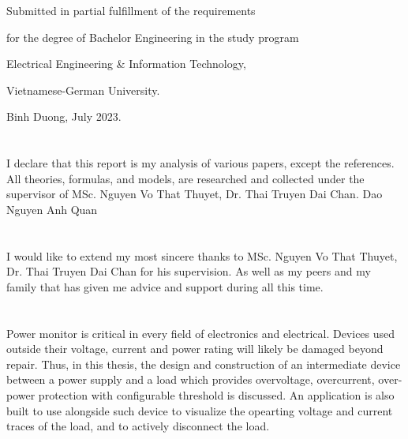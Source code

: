 \documentclass[main.tex]{subfiles}
\begin{document}
    \vspace{2cm}
    \centerline{Submitted in partial fulfillment of the requirements}
    \centerline{for the degree of Bachelor Engineering in the study program}
    \centerline{Electrical Engineering \& Information Technology,}
    \centerline{Vietnamese-German University.}
    \centerline{Binh Duong, July 2023.}

    \pagebreak
    \section*{}
    \justify
    I declare that this report is my analysis of various papers, except the references. All theories, formulas, and models, are researched and collected under the supervisor of MSc. Nguyen Vo That Thuyet, Dr. Thai Truyen Dai Chan.
    \justify
    \hspace{10cm}Dao Nguyen Anh Quan

    \pagebreak
    \section*{}
    \justify
    I would like to extend my most sincere thanks to MSc. Nguyen Vo That Thuyet, Dr. Thai Truyen Dai Chan for his supervision. As well as my peers and my family that has given me advice and support during all this time.

    \pagebreak
    \section*{}
    \justify
    Power monitor is critical in every field of electronics and electrical. Devices used outside their voltage, current and power rating will likely be damaged beyond repair. Thus, in this thesis, the design and construction of an intermediate device between a power supply and a load which provides overvoltage, overcurrent, over-power protection with configurable threshold is discussed. An application is also built to use alongside such device to visualize the opearting voltage and current traces of the load, and to actively disconnect the load.
\end{document}
